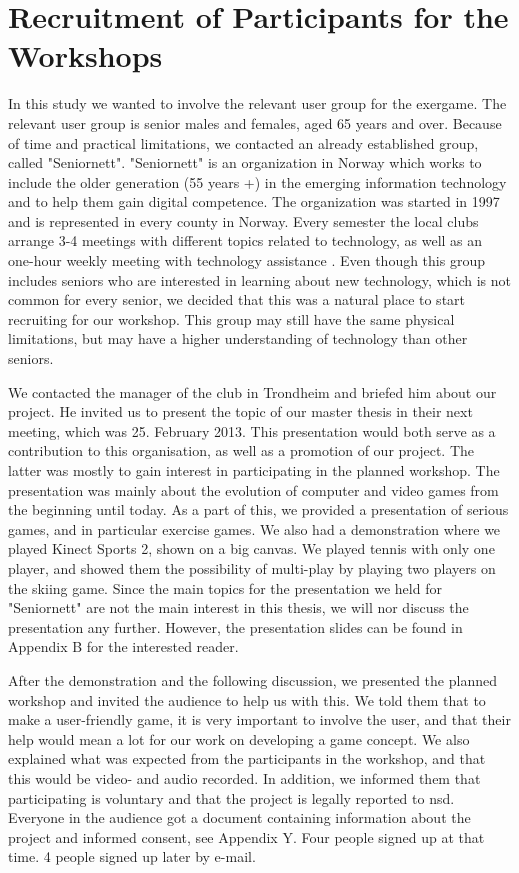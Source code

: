 \section{Recruitment of Participants for the Workshops}
In this study we wanted to involve the relevant user group for the exergame. The relevant user group is senior males and females, aged 65 years and over. Because of time and practical limitations, we contacted an already established group, called "Seniornett". "Seniornett" is an organization in Norway which works to include the older generation (55 years +) in the emerging information technology and to help them gain digital competence. The organization was started in 1997 and is represented in every county in Norway.  Every semester the local clubs arrange 3-4 meetings with different topics related to technology, as well as an one-hour weekly meeting with technology assistance \cite{seniornett}. Even though this group includes seniors who are interested in learning about new technology, which is not common for every senior, we decided that this was a natural place to start recruiting for our workshop. This group may still have the same physical limitations, but may have a higher understanding of technology than other seniors. 

We contacted the manager of the club in Trondheim and briefed him about our project. He invited us to present the topic of our master thesis in their next meeting, which was 25. February 2013. This presentation would both serve as a contribution to this organisation, as well as a promotion of our project. The latter was mostly to gain interest in participating in the planned workshop. The presentation was mainly about the evolution of computer and video games from the beginning until today. As a part of this, we provided a presentation of serious games, and in particular exercise games. We also had a demonstration where we played Kinect Sports 2, shown on a big canvas. We played tennis with only one player, and showed them the possibility of multi-play by playing two players on the skiing game. Since the main topics for the presentation we held for "Seniornett" are not the main interest in this thesis, we will nor discuss the presentation any further. However, the presentation slides can be found in Appendix B for the interested reader. 

After the demonstration and the following discussion, we presented the planned workshop and invited the audience to help us with this. We told them that to make a user-friendly game, it is very important to involve the user, and that their help would mean a lot for our work on developing a game concept. We also explained what was expected from the participants in the workshop, and that this would be video- and audio recorded. In addition, we informed them that participating is voluntary and that the project is legally reported to \ac{nsd}. Everyone in the audience got a document containing information about the project and informed consent, see Appendix Y. Four people signed up at that time. 4 people signed up later by e-mail.

